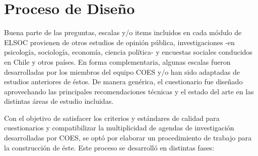 \documentclass[
]{book}
\begin{document}
\hypertarget{proceso-de-diseuxf1o}{%
\section{Proceso de Diseño}\label{proceso-de-diseuxf1o}}

Buena parte de las preguntas, escalas y/o items incluidos en cada módulo de ELSOC provienen de otros estudios de opinión pública, investigaciones -en psicología, sociología, economía, ciencia política- y encuestas sociales conducidos en Chile y otros países. En forma complementaria, algunas escalas fueron desarrolladas por los miembros del equipo COES y/o han sido adaptadas de estudios anteriores de éstos. De manera genérica, el cuestionario fue diseñado aprovechando las principales recomendaciones técnicas y el estado del arte en las distintas áreas de estudio incluidas.

Con el objetivo de satisfacer los criterios y estándares de calidad para cuestionarios y compatibilizar la multiplicidad de agendas de investigación desarrolladas por COES, se optó por elaborar un procedimiento de trabajo para la construcción de éste. Este proceso se desarrolló en distintas fases:
\end{document}
